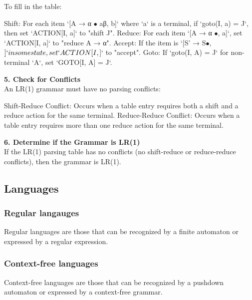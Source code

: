 To fill in the table:

Shift: For each item `[A → α $\bullet$ aβ, b]` where `a` is a terminal, if `goto(I, a) = J`, then set `ACTION[I, a]` to "shift J".
Reduce: For each item `[A → α $\bullet$, a]`, set `ACTION[I, a]` to "reduce A → α".
Accept: If the item is `[S' → S$\bullet$, $]` in some state, set `ACTION[I, $]` to "accept".
Goto: If `goto(I, A) = J` for non-terminal `A`, set `GOTO[I, A] = J`.

\textbf{5. Check for Conflicts}\\

An LR(1) grammar must have no parsing conflicts:

Shift-Reduce Conflict: Occurs when a table entry requires both a shift and a reduce action for the same terminal.
Reduce-Reduce Conflict: Occurs when a table entry requires more than one reduce action for the same terminal.

\textbf{6. Determine if the Grammar is LR(1)}\\

If the LR(1) parsing table has no conflicts (no shift-reduce or reduce-reduce conflicts), then the grammar is LR(1).


\subsection{Languages}

\subsubsection{Regular langauges}
Regular languages are those that can be recognized by a finite automaton or expressed by a regular expression.

\subsubsection{Context-free languages}
Context-free languages are those that can be recognized by a pushdown automaton or expressed by a context-free grammar.
